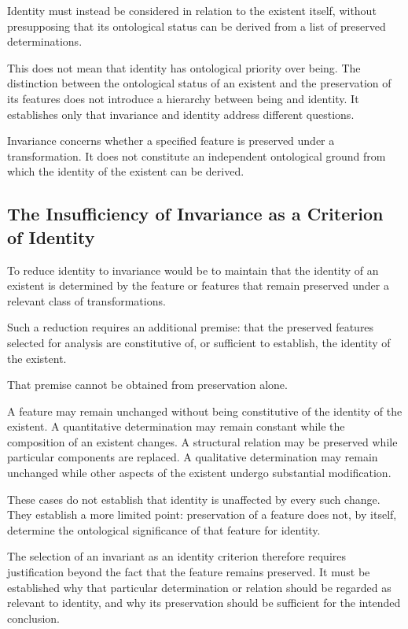 Identity must instead be considered in relation
to the existent itself, without presupposing that
its ontological status can be derived from a list
of preserved determinations.

This does not mean that identity has ontological
priority over being. The distinction between the
ontological status of an existent and the preservation
of its features does not introduce a hierarchy between
being and identity. It establishes only that invariance
and identity address different questions.

Invariance concerns whether a specified feature
is preserved under a transformation. It does not
constitute an independent ontological ground from
which the identity of the existent can be derived.

\subsection{The Insufficiency of Invariance as a Criterion of Identity}

To reduce identity to invariance would be to maintain
that the identity of an existent is determined by
the feature or features that remain preserved under
a relevant class of transformations.

Such a reduction requires an additional premise:
that the preserved features selected for analysis
are constitutive of, or sufficient to establish,
the identity of the existent.

That premise cannot be obtained from preservation
alone.

A feature may remain unchanged without being
constitutive of the identity of the existent. A
quantitative determination may remain constant
while the composition of an existent changes.
A structural relation may be preserved while
particular components are replaced. A qualitative
determination may remain unchanged while other
aspects of the existent undergo substantial
modification.

These cases do not establish that identity is
unaffected by every such change. They establish
a more limited point: preservation of a feature
does not, by itself, determine the ontological
significance of that feature for identity.

The selection of an invariant as an identity criterion
therefore requires justification beyond the fact
that the feature remains preserved. It must be
established why that particular determination
or relation should be regarded as relevant to
identity, and why its preservation should be
sufficient for the intended conclusion.

